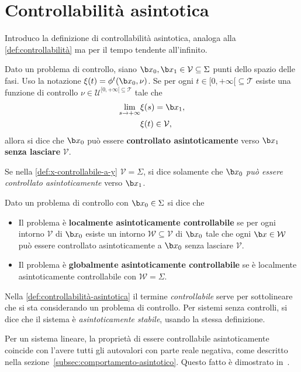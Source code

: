 \section{Controllabilità asintotica}
Introduco la definizione di controllabilità asintotica, analoga alla
\autoref{def:controllabilità} ma per il tempo tendente all'infinito.
\begin{definition}
    Dato un problema di controllo, siano
     $\b x_0, \b x_1 \in \mathcal V \subseteq \Sigma$ punti dello spazio delle fasi.
    Uso la notazione $\xi(t) = \phi^t(\b x_0, \nu)$.
    Se per ogni $t \in[0, +\infty[ \subseteq \mathcal T$
    esiste una funzione di controllo $\nu \in  \mathcal U^{[0, +\infty[ \subseteq \mathcal T}$ tale che
    \begin{align*}
       \lim_{s \to +\infty} &\xi(s) = \b x_1,\\
       &\xi(t) \in \mathcal V,
    \end{align*}
    allora si dice che $\b x_0$ può essere \textbf{controllato asintoticamente} verso
    $\b x_1$ \textbf{senza lasciare} $\mathcal V$.
    \label{def:x-controllabile-a-y}
\end{definition}
Se nella \autoref{def:x-controllabile-a-y} $\mathcal V = \Sigma$,
si dice solamente che
$\b x_0$ \emph{può essere controllato asintoticamente} verso $\b x_1$.
\begin{definition}
    Dato un problema di controllo con $\b x_0 \in \Sigma$ si dice che
    \begin{itemize}
        \item Il problema è \textbf{localmente asintoticamente controllabile}
        se per ogni intorno $\mathcal V$ di $\b x_0$ esiste un intorno
        $\mathcal W \subseteq \mathcal V$ di $\b x_0$ tale che ogni $\b x \in \mathcal W$
        può essere controllato asintoticamente a $\b x_0$ senza lasciare $\mathcal V$.

        \item Il problema è \textbf{globalmente asintoticamente controllabile} se
        è localmente asintoticamente controllabile con $\mathcal W = \Sigma$.
    \end{itemize}
    \label{def:controllabilità-asintotica}
\end{definition}
Nella \autoref{def:controllabilità-asintotica} il termine \emph{controllabile}
serve per sottolineare che si sta considerando un problema di controllo.
Per sistemi senza controlli, si dice che il sistema è \emph{asintoticamente stabile}, usando la
stessa definizione.

Per un sistema lineare, la proprietà di
essere controllabile asintoticamente coincide con l'avere tutti gli autovalori
con parte reale negativa, come descritto nella sezione~\ref{subsec:comportamento-asintotico}.
Questo fatto è dimostrato in~\cite{sontagMath}.
